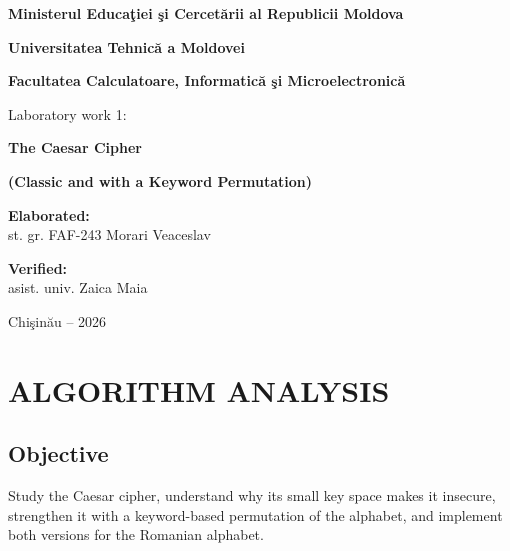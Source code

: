 \documentclass[12pt,a4paper]{article}
\begin{document}
\begin{titlepage}
  \centering
  \vspace*{0.5cm}
  {\bfseries Ministerul Educaţiei şi Cercetării al Republicii Moldova\par}
  \vspace{0.25cm}
  {\bfseries Universitatea Tehnică a Moldovei\par}
  \vspace{0.25cm}
  {\bfseries Facultatea Calculatoare, Informatică şi Microelectronică\par}

  \vspace{4cm}
  {\LARGE Laboratory work 1:\par}
  \vspace{0.3cm}
  {\Large\bfseries The Caesar Cipher\par}
  \vspace{0.2cm}
  {\large\bfseries (Classic and with a Keyword Permutation)\par}

  \vspace{3cm}
  \hspace{4cm}
  \begin{minipage}{0.5\textwidth}
    \textbf{Elaborated:}\\
    st. gr. FAF-243 Morari Veaceslav

    \vspace{0.5cm}
    \textbf{Verified:}\\
    asist. univ. Zaica Maia
  \end{minipage}

  \vfill
  {\large Chişinău -- 2026\par}
\end{titlepage}

\tableofcontents
\newpage

\section{ALGORITHM ANALYSIS}

\subsection{Objective}

Study the Caesar cipher, understand why its small key space makes it insecure,
strengthen it with a keyword-based permutation of the alphabet, and implement both
versions for the Romanian alphabet.
\end{document}
